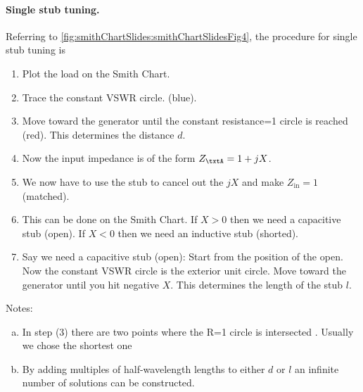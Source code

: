 \paragraph{Single stub tuning.}

Referring to \cref{fig:smithChartSlides:smithChartSlidesFig4}, the procedure for single stub tuning is


\begin{enumerate}
\item Plot the load on the Smith Chart.
\item Trace the constant VSWR circle. (blue).
\item Move toward the generator until the constant resistance=1 circle is reached (red).  This determines the distance \(d\).
\item Now the input impedance is of the form \(Z_\txtA = 1 + j X\).
\item We now have to use the stub to cancel out the \( j X \) and make \( Z_{\textrm{in}} = 1 \) (matched).
\item This can be done on the Smith Chart. If \( X>0 \) then we need a capacitive stub (open). If \( X<0 \) then we need an inductive stub (shorted).
\item Say we need a capacitive stub (open): Start from the position of the open. Now the constant VSWR circle is the exterior unit
circle. Move toward the generator until you hit negative \( X \). This determines the length of the stub \( l \).
\end{enumerate}

Notes:
\begin{enumerate}[(a)]
\item In step (3) there are two points where the R=1 circle is intersected . Usually we chose the shortest one 
\item By adding multiples of half-wavelength lengths to either \(d\) or \(l\) an infinite number of solutions can be constructed.
\end{enumerate}



